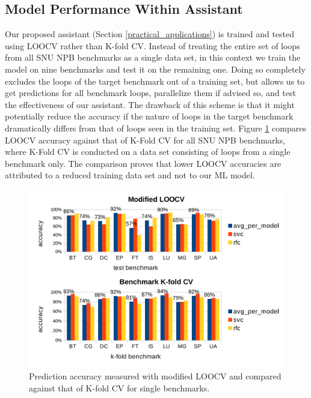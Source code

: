 \subsection{Model Performance Within Assistant}
\label{evaluation_loocv}
\quad Our proposed assistant (Section \ref{practical_applications}) is trained and tested using LOOCV rather than K-fold CV. Instead of treating the entire set of loops from all SNU NPB benchmarks as a single data set, in this context we train the model on nine benchmarks and test it on the remaining one. Doing so completely excludes the loops of the target benchmark out of a training set, but allows us to get predictions for all benchmark loops, parallelize them if advised so, and test the effectiveness of our assistant. The drawback of this scheme is that it might potentially reduce the accuracy if the nature of loops in the target benchmark dramatically differs from that of loops seen in the training set. Figure \ref{fig:accuracy_loocv_vs_kfold} compares LOOCV accuracy against that of K-Fold CV for all SNU NPB benchmarks, where K-Fold CV is conducted on a data set consisting of loops from a single benchmark only. The comparison proves that lower LOOCV accuracies are attributed to a reduced training data set and not to our ML model.
\begin{figure}[ht]
\includegraphics[width=1.0\textwidth]{images/LOOCV_accuracy.pdf}
\caption{Prediction accuracy measured with modified LOOCV and compared against that of K-fold CV for single benchmarks.}
\label{fig:accuracy_loocv_vs_kfold}
\vspace{-5mm}
\end{figure}
